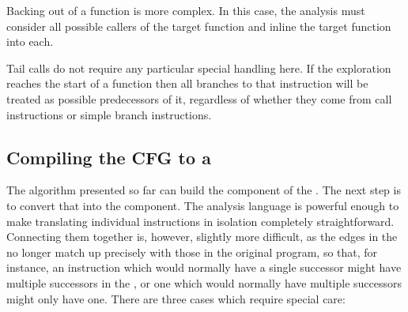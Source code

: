 Backing out of a function is more complex.  In this case, the analysis
must consider all possible callers of the target function and inline
the target function into each.  


Tail calls do not require any particular special handling here.  If
the exploration reaches the start of a function then all branches to
that instruction will be treated as possible predecessors of it,
regardless of whether they come from call instructions or simple
branch instructions.

\subsection{Compiling the CFG to a \StateMachine}
\label{sect:derive:compile_cfg}


The algorithm presented so far can build the  component
of the {\StateMachine}.  The next step is to convert that
 into the  component.  The
{\StateMachine} analysis language is powerful enough to make
translating individual instructions in isolation completely
straightforward.  Connecting them together is, however,
slightly more difficult, as the edges in the  no
longer match up precisely with those in the original program,
so that, for instance, an instruction which would normally
have a single successor might have multiple successors in the
, or one which would normally have multiple successors
might only have one.  There are three cases which require
special care:

